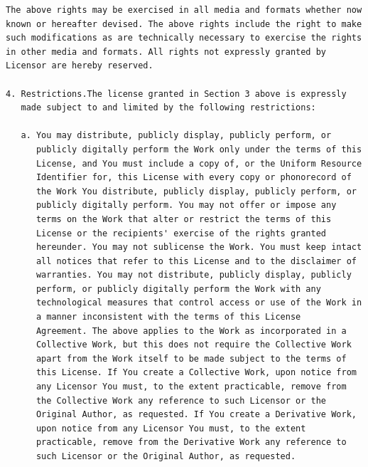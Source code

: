 \begin{verbatim}
The above rights may be exercised in all media and formats whether now
known or hereafter devised. The above rights include the right to make
such modifications as are technically necessary to exercise the rights
in other media and formats. All rights not expressly granted by
Licensor are hereby reserved.

4. Restrictions.The license granted in Section 3 above is expressly
   made subject to and limited by the following restrictions:

   a. You may distribute, publicly display, publicly perform, or
      publicly digitally perform the Work only under the terms of this
      License, and You must include a copy of, or the Uniform Resource
      Identifier for, this License with every copy or phonorecord of
      the Work You distribute, publicly display, publicly perform, or
      publicly digitally perform. You may not offer or impose any
      terms on the Work that alter or restrict the terms of this
      License or the recipients' exercise of the rights granted
      hereunder. You may not sublicense the Work. You must keep intact
      all notices that refer to this License and to the disclaimer of
      warranties. You may not distribute, publicly display, publicly
      perform, or publicly digitally perform the Work with any
      technological measures that control access or use of the Work in
      a manner inconsistent with the terms of this License
      Agreement. The above applies to the Work as incorporated in a
      Collective Work, but this does not require the Collective Work
      apart from the Work itself to be made subject to the terms of
      this License. If You create a Collective Work, upon notice from
      any Licensor You must, to the extent practicable, remove from
      the Collective Work any reference to such Licensor or the
      Original Author, as requested. If You create a Derivative Work,
      upon notice from any Licensor You must, to the extent
      practicable, remove from the Derivative Work any reference to
      such Licensor or the Original Author, as requested.


\end{verbatim}
